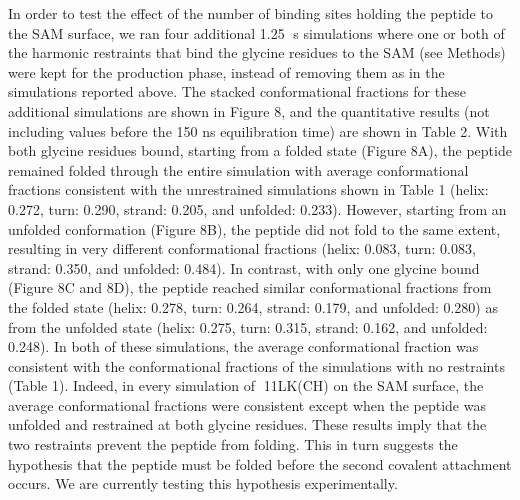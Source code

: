 In order to test the effect of the number of binding sites holding the peptide to the SAM surface, we ran four additional 1.25 s simulations where one or both of the harmonic restraints that bind the glycine residues to the SAM (see Methods) were kept for the production phase, instead of removing them as in the simulations reported above. The stacked conformational fractions for these additional simulations are shown in Figure 8, and the quantitative results (not including values before the 150 ns equilibration time) are shown in Table 2. With both glycine residues bound, starting from a folded state (Figure 8A), the peptide remained folded through the entire simulation with average conformational fractions consistent with the unrestrained simulations shown in Table 1 (helix: 0.272, turn: 0.290, strand: 0.205, and unfolded: 0.233). However, starting from an unfolded conformation (Figure 8B), the peptide did not fold to the same extent, resulting in very different conformational fractions (helix: 0.083, turn: 0.083, strand: 0.350, and unfolded: 0.484). In contrast, with only one glycine bound (Figure 8C and 8D), the peptide reached similar conformational fractions from the folded state (helix: 0.278, turn: 0.264, strand: 0.179, and unfolded: 0.280) as from the unfolded state (helix: 0.275, turn: 0.315, strand: 0.162, and unfolded: 0.248). In both of these simulations, the average conformational fraction was consistent with the conformational fractions of the simulations with no restraints (Table 1). Indeed, in every simulation of 11LK(CH) on the SAM surface, the average conformational fractions were consistent except when the peptide was unfolded and restrained at both glycine residues. These results imply that the two restraints prevent the peptide from folding. This in turn suggests the hypothesis that the peptide must be folded before the second covalent attachment occurs. We are currently testing this hypothesis experimentally.
